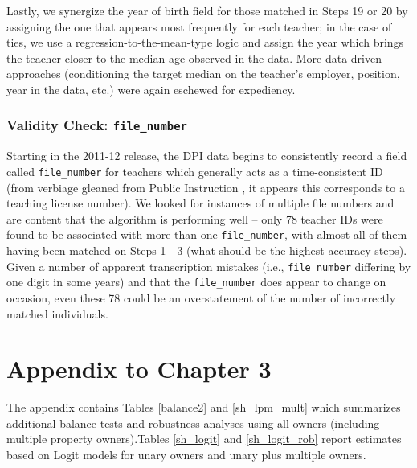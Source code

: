 \begin{appendices}
Lastly, we synergize the year of birth field for those matched in Steps
19 or 20 by assigning the one that appears most frequently for each
teacher; in the case of ties, we use a regression-to-the-mean-type logic
and assign the year which brings the teacher closer to the median age
observed in the data. More data-driven approaches (conditioning the
target median on the teacher's employer, position, year in the data,
etc.) were again eschewed for expediency.

\subsection{\texorpdfstring{Validity Check:
\texttt{file\_number}}{Validity Check: file\_number}}\label{validity-check-file_number}

Starting in the 2011-12 release, the DPI data begins to consistently
record a field called \texttt{file\_number} for teachers which generally
acts as a time-consistent ID (from verbiage gleaned from Public
Instruction
\citeyear{dpi_errata},
it appears this corresponds to a teaching license number). We looked for
instances of multiple file numbers and are content that the algorithm is
performing well -- only 78 teacher IDs were found to be associated with
more than one \texttt{file\_number}, with almost all of them having been
matched on Steps 1 - 3 (what should be the highest-accuracy steps).
Given a number of apparent transcription mistakes (i.e.,
\texttt{file\_number} differing by one digit in some years) and that the
\texttt{file\_number} does appear to change on occasion, even these 78
could be an overstatement of the number of incorrectly matched
individuals.


\chapter{Appendix to Chapter 3}


The appendix contains Tables \ref{balance2} and \ref{sh_lpm_mult}
which summarizes additional balance tests and robustness analyses
using all owners (including multiple property owners).Tables
\ref{sh_logit} and \ref{sh_logit_rob} report estimates based on Logit
models for unary owners and unary plus multiple owners.

\setcounter{table}{0}
\renewcommand{\thetable}{A\arabic{table}}



\end{appendices}
